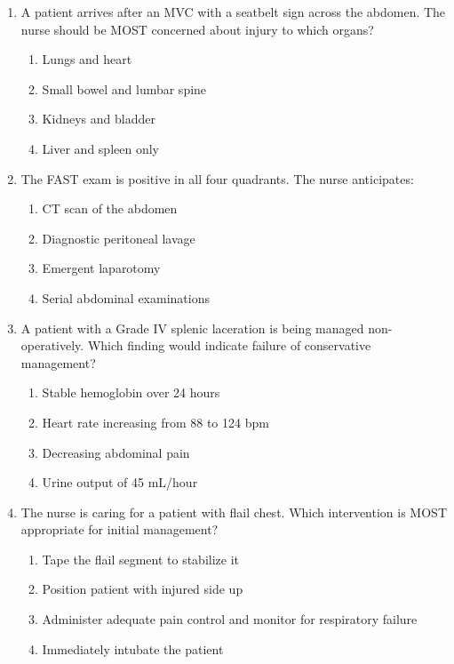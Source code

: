 \documentclass[11pt]{article}
\begin{document}
\begin{enumerate}
\item A patient arrives after an MVC with a seatbelt sign across the abdomen. The nurse should be MOST concerned about injury to which organs?

\begin{enumerate}[label=\Alph*.]
    \item Lungs and heart
    \item Small bowel and lumbar spine
    \item Kidneys and bladder
    \item Liver and spleen only
\end{enumerate}

\item The FAST exam is positive in all four quadrants. The nurse anticipates:

\begin{enumerate}[label=\Alph*.]
    \item CT scan of the abdomen
    \item Diagnostic peritoneal lavage
    \item Emergent laparotomy
    \item Serial abdominal examinations
\end{enumerate}

\item A patient with a Grade IV splenic laceration is being managed non-operatively. Which finding would indicate failure of conservative management?

\begin{enumerate}[label=\Alph*.]
    \item Stable hemoglobin over 24 hours
    \item Heart rate increasing from 88 to 124 bpm
    \item Decreasing abdominal pain
    \item Urine output of 45 mL/hour
\end{enumerate}

\item The nurse is caring for a patient with flail chest. Which intervention is MOST appropriate for initial management?

\begin{enumerate}[label=\Alph*.]
    \item Tape the flail segment to stabilize it
    \item Position patient with injured side up
    \item Administer adequate pain control and monitor for respiratory failure
    \item Immediately intubate the patient
\end{enumerate}


\end{enumerate}
\end{document}

